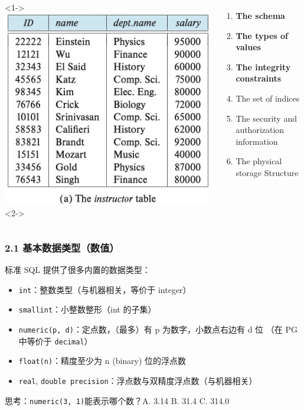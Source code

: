 \documentclass[aspectratio=169, 14pt]{beamer}
\begin{document}
\begin{frame}
\begin{columns}
    <1->
    \includegraphics[height=.68\paperheight]{table/instructor}
    <2->
    \begin{enumerate}
        \item \textbf{The schema}
        \item \textbf{The types of values}
        \item \textbf{The integrity constraints}
        \item The set of indices
        \item The security and authorization information
        \item The physical storage Structure
    \end{enumerate}
\end{columns}

    

\end{frame}

\begin{frame}
    \frametitle{2.1 基本数据类型（数值）}
标准 SQL 提供了很多内置的数据类型：
\begin{itemize}
    \item \texttt{int}：整数类型（与机器相关，等价于 integer）
    \item \texttt{smallint}：小整数整形（int 的子集）
    \item \texttt{numeric(p, d)}：定点数，（最多）有 p 为数字，小数点右边有 d 位 （在 PG 中等价于 \texttt{decimal}）
    \item \texttt{float(n)}：精度至少为 n (binary) 位的浮点数
    \item \texttt{real}, \texttt{double precision}：浮点数与双精度浮点数（与机器相关）
\end{itemize}
\pause
\alert{思考}：\texttt{numeric(3, 1)}能表示哪个数？A. 3.14 B. 31.4 C. 314.0
\end{frame}
\end{document}
